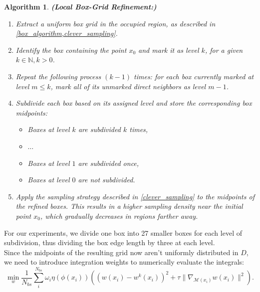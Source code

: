 \documentclass[12pt,openany]{book}
\theoremstyle{plainnormal}
\newtheorem{algorithm}[theorem]{Algorithm}
\theoremstyle{remark}
\begin{document}
\begin{algorithm}\textbf{(Local Box-Grid Refinement:)}
\begin{enumerate}
    \item Extract a uniform box grid in the occupied region, as described in \cref{box_algorithm,clever_sampling}.
    
    \item Identify the box containing the point \(x_0\) and mark it as level \(k\), for a given \(k \in \mathbb{N}, k > 0\).
    
    \item Repeat the following process \((k - 1)\) times: for each box currently marked at level \(m \leq k\), mark all of its unmarked direct neighbors as level \(m - 1\).
    
    \item Subdivide each box based on its assigned level and store the corresponding box midpoints:
    \begin{itemize}
        \item Boxes at level \(k\) are subdivided \(k\) times,
        \item $\dots$
        \item Boxes at level \(1\) are subdivided once,
        \item Boxes at level \(0\) are not subdivided.
    \end{itemize}
    
    \item Apply the sampling strategy described in \cref{clever_sampling} to the midpoints of the refined boxes. This results in a higher sampling density near the initial point \(x_0\), which gradually decreases in regions farther away.
\end{enumerate}
\end{algorithm}
For our experiments, we divide one box into 27 smaller boxes for each level of subdivision, thus dividing the box edge length by three at each level.\\
Since the midpoints of the resulting grid now aren't uniformly distributed in $D$, we need to introduce integration weights to numerically evaluate the integrals: 
\begin{equation*}
    \min_w \frac{1}{N_{bs}} \sum_i^{N_{bs}} \omega_i \eta(\phi(x_i)) \left((w(x_i) - w^k(x_i))^2 + \tau \|\nabla_{\mathcal{M}(x_i)} w(x_i)\|^2\right).
\end{equation*}
\end{document}
